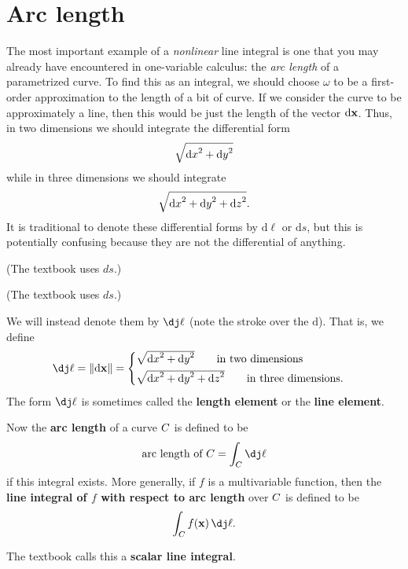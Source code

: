 \section{Arc length}
\label{sec:arc-length}

The most important example of a \emph{nonlinear} line integral is one that you may already have encountered in one-variable calculus: the \emph{arc length} of a parametrized curve.
To find this as an integral, we should choose $\omega$ to be a first-order approximation to the length of a bit of curve.
If we consider the curve to be approximately a line, then this would be just the length of the vector ${\mathrm{d} \mathbf{x}}$.
Thus, in two dimensions we should integrate the differential form
\[ \sqrt{{\mathrm{d} x}^2+{\mathrm{d} y}^2}\]
while in three dimensions we should integrate
\[ \sqrt{{\mathrm{d} x}^2+{\mathrm{d} y}^2 + {\mathrm{d} z}^2}.\]
It is traditional to denote these differential forms by $\mathrm{d}\ell$ or $\mathrm{d}s$, but this is potentially confusing because they are not the differential of anything.
\begin{stewart}(The textbook uses $ds$.)\end{stewart}%
\begin{rogawski}(The textbook uses $ds$.)\end{rogawski}
We will instead denote them by $\dl$ (note the stroke over the $\mathrm{d}$).
That is, we define
\[ \dl = \mgn{\dpx} =
\begin{cases}
  \sqrt{\dx^2+\dy^2}\qquad\text{in two dimensions}\\[3pt]
  \sqrt{\dx^2+\dy^2+\dz^2}\qquad\text{in three dimensions}.
\end{cases}\]
The form $\dl$ is sometimes called the \textbf{length element} or the \textbf{line element}.

Now the \textbf{arc length} of a curve $C$ is defined to be
\[ \text{arc length of } \curve = \lint{\curve} \dl \]
if this integral exists.
More generally, if $f$ is a multivariable function, then the \textbf{line integral of $f$ with respect to arc length} over $C$ is defined to be
\[ \lint{\curve} f(\ptx)\,\dl. \]
\begin{rogawski}The textbook calls this a \textbf{scalar line integral}.\end{rogawski}

